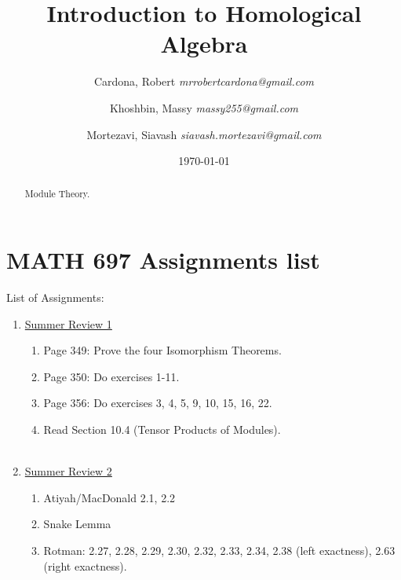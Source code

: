 \documentclass[8pt]{amsart}
\theoremstyle{plain}%
\theoremstyle{definition}
\theoremstyle{remark}
\numberwithin{equation}{section}
\begin{document}
\title[MATH 697]{Introduction to Homological Algebra}


\author{
	Cardona, Robert \textit{mrrobertcardona@gmail.com}
	\and
	Khoshbin, Massy \textit{massy255@gmail.com}
	\and
	Mortezavi, Siavash \textit{siavash.mortezavi@gmail.com}
}


\address{Department of Mathematics \\ California State University Long Beach}

\date{\today}

\begin{abstract}
Module Theory.
\end{abstract}

\maketitle

\setcounter{section}{0}
\section{MATH 697 Assignments list}

List of Assignments:\\
\begin{enumerate}
\item \underline{Summer Review 1}\\
		\begin{enumerate}
		\item Page 349: Prove the four Isomorphism Theorems.
		\item Page 350: Do exercises 1-11.
		\item Page 356: Do exercises 3, 4, 5, 9, 10, 15, 16, 22.
		\item Read Section 10.4 (Tensor Products of Modules).\\
		\\
		\end{enumerate}
\item \underline{Summer Review 2}\\
		\begin{enumerate}
		\item Atiyah/MacDonald 2.1, 2.2
		\item Snake Lemma
		\item Rotman: 2.27, 2.28, 2.29, 2.30, 2.32, 2.33, 2.34, 2.38 (left exactness), 2.63 (right exactness).
		\end{enumerate}				
\end{enumerate}
\end{document}
